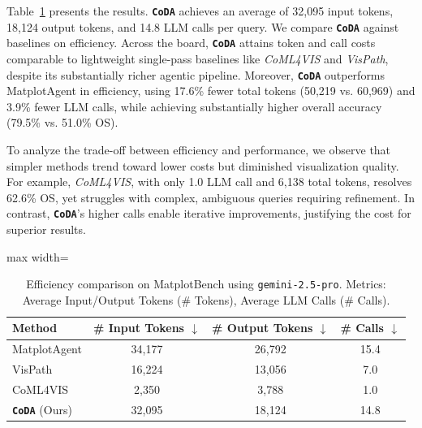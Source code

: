 \documentclass[11pt, a4paper, logo, copyright]{googlecloud}
\newcommand{\methodname}{\textbf{\texttt{\textcolor{StarIndigo}{C}\textcolor{StarIndigo}{o}\textcolor{StarCoral}{D}\textcolor{StarTeal}{A}}}}
\newcommand{\io}[1]{\setlength{\fboxsep}{1pt}\colorbox{gray!10}{\texttt{#1}}}
\begin{document}
Table~\ref{tab:efficiency-comparison} presents the results. \methodname{} achieves an average of 32,095 input tokens, 18,124 output tokens, and 14.8 LLM calls per query.
We compare \methodname{} against baselines on efficiency. Across the board, \methodname{} attains token and call costs comparable to lightweight single-pass baselines like \textit{CoML4VIS} and \textit{VisPath}, despite its substantially richer agentic pipeline. Moreover, \methodname{} outperforms MatplotAgent in efficiency, using 17.6\% fewer total tokens (50,219 vs. 60,969) and 3.9\% fewer LLM calls, while achieving substantially higher overall accuracy (79.5\% vs. 51.0\% OS).

To analyze the trade-off between efficiency and performance, we observe that simpler methods trend toward lower costs but diminished visualization quality. For example, \textit{CoML4VIS}, with only 1.0 LLM call and 6,138 total tokens, resolves 62.6\% OS, yet struggles with complex, ambiguous queries requiring refinement. In contrast, \methodname{}'s higher calls enable iterative improvements, justifying the cost for superior results.



\begin{table}[t]
\caption{Efficiency comparison on MatplotBench using \io{gemini-2.5-pro}. Metrics: Average Input/Output Tokens (\# Tokens), Average LLM Calls (\# Calls).}
\centering
\footnotesize
\setlength{\tabcolsep}{8pt}
\begin{adjustbox}{max width=\linewidth}
\begin{tabular}{lccc}
\toprule
\textbf{Method} & \textbf{\# Input Tokens $\downarrow$} & \textbf{\# Output Tokens $\downarrow$} & \textbf{\# Calls $\downarrow$} \\
\midrule
MatplotAgent       & 34,177 & 26,792 & 15.4 \\
VisPath            & 16,224 & 13,056 & 7.0 \\
CoML4VIS           & 2,350 & 3,788 & 1.0 \\ \midrule
\methodname{} (Ours) & 32,095 & 18,124 & 14.8 \\
\bottomrule
\end{tabular}
\end{adjustbox}
\label{tab:efficiency-comparison}
\end{table}
\end{document}
